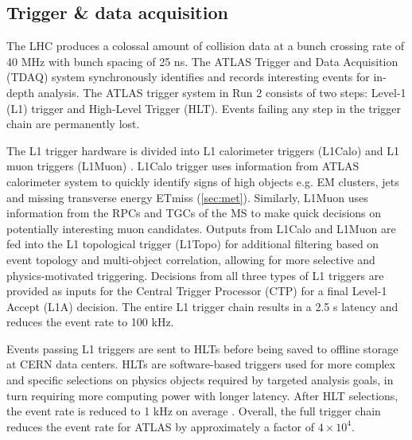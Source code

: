 \documentclass[../thesis.tex]{subfiles}
\begin{document}

\subsection{Trigger \& data acquisition}
The \acs{LHC} produces a colossal amount of collision data at a bunch crossing rate of 40 MHz with bunch spacing of 25 ns. The ATLAS Trigger and Data Acquisition (\acs{TDAQ}) system \citep{lhc:atlas_trigger} synchronously identifies and records interesting events for in-depth analysis. The ATLAS trigger system in Run 2 consists of two steps: Level-1 (\acs{L1}) trigger and High-Level Trigger (\acs{HLT}). Events failing any step in the trigger chain are permanently lost.

The \acs{L1} trigger hardware is divided into \acs{L1} calorimeter triggers (L1Calo) and \acs{L1} muon triggers (L1Muon) \citep{lhc:atlas_trigger}. L1Calo trigger uses information from ATLAS calorimeter system to quickly identify signs of high \pT objects e.g. \acs{EM} clusters, jets and missing transverse energy \acs{ETmiss} (\autoref{sec:met}). Similarly, L1Muon uses information from the \acs{RPC}s and \acs{TGC}s of the \acs{MS} to make quick decisions on potentially interesting muon candidates. Outputs from L1Calo and L1Muon are fed into the \acs{L1} topological trigger (L1Topo) for additional filtering based on event topology and multi-object correlation, allowing for more selective and physics-motivated triggering. Decisions from all three types of \acs{L1} triggers are provided as inputs for the Central Trigger Processor (\acs{CTP}) for a final Level-1 Accept (L1A) decision. The entire \acs{L1} trigger chain results in a 2.5 \textmu s latency and reduces the event rate to 100 kHz.

Events passing \acs{L1} triggers are sent to \acs{HLT}s before being saved to offline storage at \acs{CERN} data centers. \acs{HLT}s are software-based triggers used for more complex and specific selections on physics objects required by targeted analysis goals, in turn requiring more computing power with longer latency. After \acs{HLT} selections, the event rate is reduced to 1 kHz on average  \citep{lhc:atlas_trigger}. Overall, the full trigger chain reduces the event rate for ATLAS by approximately a factor of $4\times 10^4$.
\end{document}
